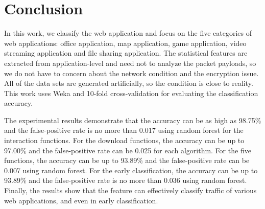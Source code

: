 \documentclass[preprint,12pt]{elsarticle}
\begin{document}
\section{Conclusion}
\label{sec:conclusion}
In this work, we classify the web application and focus on the five categories of web applications: office application, map application, game application, video streaming application and file sharing application. The statistical features are extracted from application-level and need not to analyze the packet payloads, so we do not have to concern about the network condition and the encryption issue. All of the data sets are generated artificially, so the condition is close to reality. This work uses Weka and 10-fold cross-validation for evaluating the classification accuracy.

The experimental results demonstrate that the accuracy can be as high as 98.75\% and the false-positive rate is no more than 0.017 using random forest for the interaction functions. For the download functions, the accuracy can be up to 97.00\% and the false-positive rate can be 0.025 for each algorithm. For the five functions, the accuracy can be up to 93.89\% and the false-positive rate can be 0.007 using random forest. For the early classification, the accuracy can be up to 93.89\% and the false-positive rate is no more than 0.036 using random forest. Finally, the results show that the feature can effectively classify traffic of various web applications, and even in early classification. 

%


\end{document}
